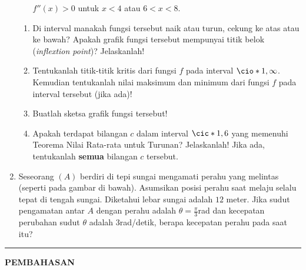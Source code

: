 \begin{enumerate}[leftmargin=*, label={\arabic*}.]
\begin{itemize}
    $f''(x)>0$ untuk $x<4$ atau $6 < x < 8$.
\end{itemize}
\begin{enumerate}[label={\alph*}.]
    \item Di interval manakah fungsi tersebut naik atau turun, cekung ke atas atau 
    ke bawah? Apakah grafik fungsi tersebut mempunyai titik belok 
    (\textit{inflextion point})? Jelaskanlah!
    \item Tentukanlah titik-titik kritis dari fungsi $f$ pada interval 
    $\cio*{1,\infty}$. Kemudian tentukanlah nilai maksimum dan minimum dari fungsi $f$ 
    pada interval tersebut (jika ada)!
    \item Buatlah sketsa grafik fungsi tersebut!
    \item Apakah terdapat bilangan $c$ dalam interval $\cic*{1,6}$ yang memenuhi 
    Teorema Nilai Rata-rata untuk Turunan? Jelaskanlah! Jika ada, tentukanlah \textbf{semua} 
    bilangan $c$ tersebut.
\end{enumerate}
\item Seseorang $(A)$ berdiri di tepi sungai mengamati perahu yang melintas (seperti pada 
gambar di bawah). Asumsikan posisi perahu saat melaju selalu tepat di tengah sungai. Diketahui 
lebar sungai adalah $12$ meter. Jika sudut pengamatan antar $A$ dengan perahu adalah 
$\theta =\frac{\pi}{3}$rad dan kecepatan perubahan sudut $\theta$ adalah $3$rad/detik, berapa 
kecepatan perahu pada saat itu?
\vspace{0.2cm}
\begin{center}
\end{center}
\end{enumerate}
\vspace{0.2cm}
\hrule height 1pt
\vspace{0.5cm}
\begin{center}
    \textbf{\large{PEMBAHASAN}}
\end{center}
